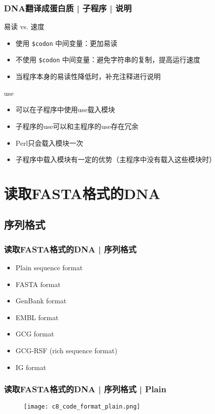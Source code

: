 \begin{frame}[fragile]
  \frametitle{DNA翻译成蛋白质 | 子程序 | \alert{说明}}
  \begin{block}{易读 vs. 速度}
    \begin{itemize}
      \item 使用 \verb|$codon| 中间变量：更加易读
      \item 不使用 \verb|$codon| 中间变量：避免字符串的复制，提高运行速度
      \item 当程序本身的易读性降低时，补充注释进行说明
    \end{itemize}
  \end{block}
  \pause
  \begin{block}{use}
    \begin{itemize}
      \item 可以在子程序中使用use载入模块
      \item 子程序的use可以和主程序的use存在冗余
      \item Perl只会载入模块一次
      \item 子程序中载入模块有一定的优势（主程序中没有载入这些模块时）
    \end{itemize}
  \end{block}
\end{frame}

\section{读取FASTA格式的DNA}
\subsection{序列格式}
\begin{frame}
  \frametitle{读取FASTA格式的DNA | 序列格式}
  \begin{itemize}
    \item Plain sequence format
    \item FASTA format
    \item GenBank format
    \item EMBL format
    \item GCG format
    \item GCG-RSF (rich sequence format)
    \item IG format
  \end{itemize}
\end{frame}

\begin{frame}
  \frametitle{读取FASTA格式的DNA | 序列格式 | \alert{Plain}}
  \begin{figure}
    \centering
    \texttt{[image: c8\_code\_format\_plain.png]}
  \end{figure}
\end{frame}

